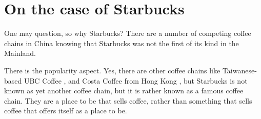 \section{On the case of Starbucks}\label{sec:case-of-sbux}

One may question, so why Starbucks? There are a number of competing coffee
chains in China knowing that Starbucks was not the first of its kind in the
Mainland.

There is the popularity aspect. Yes, there are other coffee chains like
Taiwanese-based UBC
Coffee \autocite{CITEME}, and Costa Coffee from Hong Kong \autocite{CITEME}, but
Starbucks is not known as yet another coffee chain, but it is rather known as a
famous coffee chain. They are a place to be that sells coffee, rather than
something that sells coffee that offers itself as a place to be.


